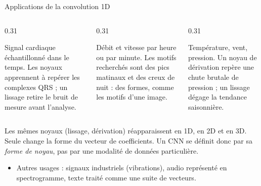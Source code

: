 \begin{frame}{Applications de la convolution 1D}
\begin{columns}[t]
\begin{column}{0.31\textwidth}
\begin{ebox}[ECG]
Signal cardiaque échantillonné dans le temps. Les noyaux apprennent à
repérer les complexes QRS ; un lissage retire le bruit de mesure avant
l'analyse.
\end{ebox}
\end{column}
\begin{column}{0.31\textwidth}
\begin{ebox}
Débit et vitesse par heure ou par minute. Les motifs recherchés sont des
pics matinaux et des creux de nuit : des formes, comme les motifs d'une image.
\end{ebox}
\end{column}
\begin{column}{0.31\textwidth}
\begin{ebox}[Météo]
Température, vent, pression. Un noyau de dérivation repère une chute brutale
de pression ; un lissage dégage la tendance saisonnière.
\end{ebox}
\end{column}
\end{columns}
\vspace{1mm}
\begin{kbox}
Les mêmes noyaux (lissage, dérivation) réapparaissent en 1D, en 2D et en 3D.
Seule change la forme du vecteur de coefficients. Un CNN se définit donc par
sa \emph{forme de noyau}, pas par une modalité de données particulière.
\end{kbox}
\begin{itemize}
  \item Autres usages : signaux industriels (vibrations), audio représenté en
  spectrogramme, texte traité comme une suite de vecteurs.
\end{itemize}
\end{frame}

